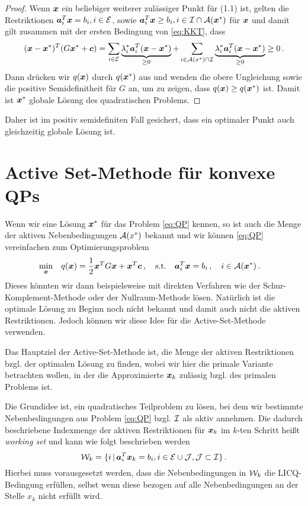 \begin{proof}
Wenn $\boldsymbol x$ ein beliebiger weiterer zulässiger Punkt für (1.1) ist, gelten die Restriktionen $\boldsymbol a_i^T\boldsymbol x = b_i,  i \in \mathcal E$,  sowie $\boldsymbol a_i^T \boldsymbol x \ge b_i, i \in \mathcal I \cap \mathcal A(\boldsymbol x^*)$ für $\boldsymbol x$ und damit gilt zusammen mit der ersten Bedingung von \eqref{eq:KKT}, dass
\[
	(\boldsymbol x-\boldsymbol x^*)^T (G\boldsymbol x^*+\boldsymbol c) = \sum_{i \in \mathcal E} \underbrace{\lambda^*_i \boldsymbol a_i^T (\boldsymbol x-\boldsymbol x^*)}_{\ge 0} + \sum_{i \in \mathcal A(x^*)\cap \mathcal I} \underbrace{\lambda^*_i \boldsymbol a_i^T (\boldsymbol x-\boldsymbol x^*)}_{\ge 0} \ge 0 \, .
\]
Dann drücken wir $q(\boldsymbol x)$ durch $q(\boldsymbol x^*)$ aus und wenden die obere Ungleichung sowie die positive Semidefinitheit für $G$ an, um zu zeigen, dass $q(\boldsymbol x) \ge q(\boldsymbol x^*)$ ist. Damit ist $\boldsymbol x^*$ globale Lösung des quadratischen Problems.
\end{proof}

Daher ist im positiv semidefiniten Fall gesichert, dass ein optimaler Punkt auch gleichzeitig globale Lösung ist.


\section{Active Set-Methode für konvexe QPs}
\label{anhang:B.2}

Wenn wir eine Lösung $\boldsymbol x^*$ für das Problem \eqref{eq:QP} kennen, so ist auch die Menge der aktiven Nebenbedingungen $\mathcal A(x^*)$ bekannt und wir können \eqref{eq:QP} vereinfachen zum Optimierungsproblem
\begin{align}\label{eq:active}
	\min_{\boldsymbol x} & \quad q(\boldsymbol x) = \frac 1 2 \boldsymbol x^T G \boldsymbol x+\boldsymbol x^T \boldsymbol c \, , \quad	\text{s.t.} \quad \boldsymbol a_i^T\boldsymbol x = b_i \, , \quad i \in \mathcal A(\boldsymbol x^*)\, .
\end{align}
Dieses könnten wir dann beispielsweise mit direkten Verfahren wie der Schur-Komplement-Methode oder der Nullraum-Methode lösen. Natürlich ist die optimale Lösung zu Beginn noch nicht bekannt und damit auch nicht die aktiven Restriktionen. Jedoch können wir diese Idee für die Active-Set-Methode verwenden.

Das Hauptziel der Active-Set-Methode ist, die Menge der aktiven Restriktionen bzgl. der optimalen Lösung zu finden, wobei wir hier die primale Variante betrachten wollen, in der die Approximierte $\boldsymbol x_k$ zulässig bzgl. des primalen Problems ist. 

Die Grundidee ist, ein quadratisches Teilproblem zu lösen, bei dem wir bestimmte Nebenbedingungen aus Problem \eqref{eq:QP} bzgl. $\mathcal I$ als aktiv annehmen. Die dadurch beschriebene Indexmenge der aktiven Restriktionen für $\boldsymbol x_k$ im $k$-ten Schritt heißt \textit{working set} und kann wie folgt beschrieben werden
\[
	\mathcal W_k = \{ i \, | \, \boldsymbol a_i^T \boldsymbol x_k = b_i,  i \in \mathcal E \cup \mathcal J, \mathcal J \subset \mathcal I\} \, .
\]
Hierbei muss vorausgesetzt werden, dass die Nebenbedingungen in $\mathcal W_k$ die LICQ-Bedingung erfüllen, selbst wenn diese bezogen auf alle Nebenbedingungen an der Stelle $x_k$ nicht erfüllt wird.

